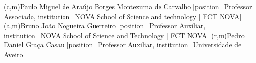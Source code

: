 %
%
%
%
%
%
(c,m){Paulo Miguel de Araújo Borges Montezuma de Carvalho}
  [position=Professor Associado, institution=NOVA School of Science and technology | FCT NOVA]
(a,m){Bruno João Nogueira Guerreiro}
  [position=Professor Auxiliar, institution=NOVA School of Science and Technology | FCT NOVA]
(r,m){Pedro Daniel Graça Casau}
  [position=Professor Auxiliar, institution=Universidade de Aveiro]

%
%
%
%
%
%
